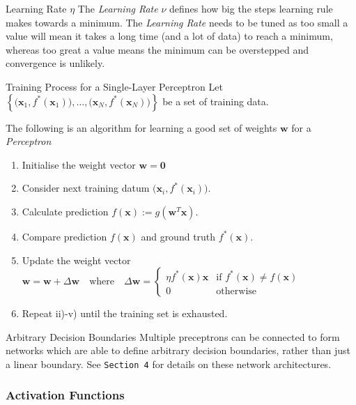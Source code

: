 \documentclass[11pt,a4paper]{article}
\begin{document}
  \begin{remark}{Learning Rate $\eta$}
    The \textit{Learning Rate} $\nu$ defines how big the steps learning rule makes towards a minimum. The \textit{Learning Rate} needs to be tuned as too small a value will mean it takes a long time (and a lot of data) to reach a minimum, whereas too great a value means the minimum can be overstepped and convergence is unlikely.
  \end{remark}

  \begin{proposition}{Training Process for a Single-Layer Perceptron}
    Let $\left\{\big(\pmb{x}_1,f^*(\pmb{x}_1)\big),\dots,\big(\pmb{x}_N,f^*(\pmb{x}_N)\big)\right\}$ be a set of training data.
    \par The following is an algorithm for learning a good set of weights $\pmb{w}$ for a \textit{Perceptron}
    \begin{enumerate}
      \item Initialise the weight vector $\pmb{w}=\pmb0$
      \item Consider next training datum $\big(\pmb{x}_i,f^*(\pmb{x}_i)\big)$.
      \item Calculate prediction $f(\pmb{x}):=g(\mathbf{w}^T\mathbf{x})$.
      \item Compare prediction $f(\pmb{x})$ and ground truth $f^*(\pmb{x})$.
      \item Update the weight vector $\pmb{w}=\pmb{w}+\Delta\pmb{w}\quad\text{where}\quad\Delta\pmb{w}=\begin{cases}\eta f^*(\pmb{x})\pmb{x}&\text{if }f^*(\pmb{x})\neq f(\pmb{x})\\0&\text{otherwise}\end{cases}$
      \item Repeat ii)-v) until the training set is exhausted.
    \end{enumerate}
  \end{proposition}

  \begin{remark}{Arbitrary Decision Boundaries}
    Multiple preceptrons can be connected to form networks which are able to define arbitrary decision boundaries, rather than just a linear boundary. See \texttt{Section 4} for details on these network architectures.
  \end{remark}

\subsubsection{Activation Functions}
\end{document}
